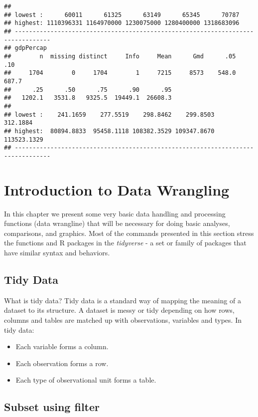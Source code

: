 \documentclass[]{book}
\begin{document}
\begin{verbatim}
## 
## lowest :      60011      61325      63149      65345      70787
## highest: 1110396331 1164970000 1230075000 1280400000 1318683096
## --------------------------------------------------------------------------------
## gdpPercap 
##        n  missing distinct     Info     Mean      Gmd      .05      .10 
##     1704        0     1704        1     7215     8573    548.0    687.7 
##      .25      .50      .75      .90      .95 
##   1202.1   3531.8   9325.5  19449.1  26608.3 
## 
## lowest :    241.1659    277.5519    298.8462    299.8503    312.1884
## highest:  80894.8833  95458.1118 108382.3529 109347.8670 113523.1329
## --------------------------------------------------------------------------------
\end{verbatim}

\chapter{Introduction to Data Wrangling}\label{IntroDataWrangling}

In this chapter we present some very basic data handling and processing
functions (data wrangline) that will be necessary for doing basic
analyses, comparisons, and graphics. Most of the commands presented in
this section stress the functions and R packages in the \emph{tidyverse}
- a set or family of packages that have similar syntax and behaviors.

\section{Tidy Data}\label{tidy-data}

What is tidy data? Tidy data is a standard way of mapping the meaning of
a dataset to its structure. A dataset is messy or tidy depending on how
rows, columns and tables are matched up with observations, variables and
types. In tidy data:

\begin{itemize}
\item
  Each variable forms a column.
\item
  Each observation forms a row.
\item
  Each type of observational unit forms a table.
\end{itemize}

\section{Subset using filter}\label{subset-using-filter}
\end{document}
